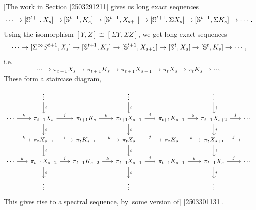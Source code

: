 \documentclass{MetricNotes2023}
\def\bb{\ensuremath\mathbb}
\begin{document}
[The work in Section \ref{2503291211} gives us long exact sequences
\[\cdots \to [\bb{S}^{t+1}, X_s] \to [\bb{S}^{t+1}, K_s] \to [\bb{S}^{t+1}, X_{s+1}]\to [\bb{S}^{t+1}, \Sigma X_s]\to [\bb{S}^{t+1}, \Sigma K_s] \to \cdots.\]
Using the isomorphism \([Y,Z]\cong [\Sigma Y, \Sigma Z]\), we get long exact sequences
\[\cdots \to [\Sigma^\infty S^{t+1}, X_s] \to [\bb{S}^{t+1}, K_s] \to [\bb{S}^{t+1}, X_{s+1}]\to [\bb{S}^{t}, X_s]\to [\bb{S}^{t}, K_s] \to \cdots,\]
i.e.
\[\cdots \to \pi_{t+1}X_s \to \pi_{t+1}K_s \to \pi_{t+1}X_{s+1}\to \pi_t X_s\to \pi_t K_s \to \cdots.\]
These form a staircase diagram,
\[\begin{tikzcd}[column sep=4ex]
   &  \vdots \arrow[d, "i"] &  & \vdots \arrow[d, "i"] &  & \vdots \arrow[d, "i"] & \\
 \cdots \arrow[r, "k"] & \pi_{t+1}X_s \arrow[d, "i"] \arrow[r, "j"] & \pi_{t+1}K_s  \arrow[r, "k"] & \pi_{t+1}X_{s+1} \arrow[d, "i"] \arrow[r, "j"] & \pi_{t+1}K_{s+1} \arrow[r, "k"] & \pi_{t+1}X_{s+2} \arrow[d, "i"] \arrow[r, "j"] & \cdots \\
 \cdots \arrow[r, "k"] & \pi_t X_{s-1} \arrow[d, "i"] \arrow[r, "j"] & \pi_t K_{s-1}  \arrow[r, "k"] & \pi_t X_s \arrow[d, "i"] \arrow[r, "j"] & \pi_t K_s \arrow[r, "k"] & \pi_t X_{s+1} \arrow[d, "i"] \arrow[r, "j"] & \cdots \\
 \cdots \arrow[r, "k"] & \pi_{t-1}X_{s-2}  \arrow[d, "i"] \arrow[r, "j"] & \pi_{t-1}K_{s-2}  \arrow[r, "k"] & \pi_{t-1}X_{s-1} \arrow[d, "i"] \arrow[r, "j"] & \pi_{t-1}K_{s-1} \arrow[r, "k"] & \pi_{t-1}X_s \arrow[d, "i"] \arrow[r, "j"] & \cdots \\
 & \vdots &  & \vdots & & \vdots &
\end{tikzcd}\]
This gives rise to a spectral sequence, by [some version of] \ref{2503301131}.
\end{document}

